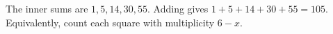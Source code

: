 The inner sums are $1,5,14,30,55$. Adding gives $1+5+14+30+55=\boxed{105}$. Equivalently, count each square with multiplicity $6-x$.
